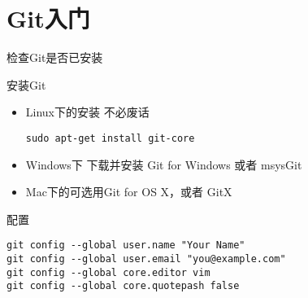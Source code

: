 \part{Git入门}

\begin{frame}[<+->][fragile]{检查Git是否已安装}
\end{frame}

\begin{frame}[<+->][fragile]{安装Git}
\begin{itemize}
  \item Linux下的安装
  不必废话
\begin{Verbatim}[frame=single,commandchars=\\\{\}]
sudo apt-get install git-core
\end{Verbatim}

  \item Windows下
  下载并安装 Git for Windows 或者 msysGit

  
  \item Mac下的可选用Git for OS X，或者 GitX
\end{itemize}
\end{frame}

\begin{frame}[<+->][fragile]{配置}
\begin{Verbatim}[frame=single,commandchars=\\\{\}]
git config --global user.name "Your Name"
git config --global user.email "you@example.com"
git config --global core.editor vim
git config --global core.quotepash false
\end{Verbatim}
\end{frame}

